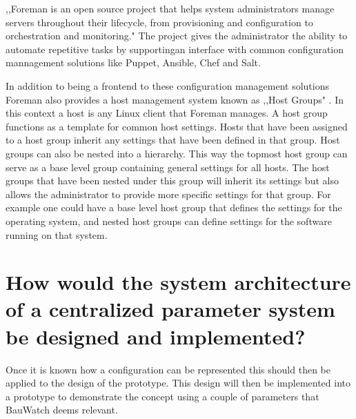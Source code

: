,,Foreman is an open source project that helps system administrators manage servers throughout their lifecycle, from provisioning and configuration to orchestration and monitoring." \cite{noauthor_foreman_nodate}
The project gives the administrator the ability to automate repetitive tasks by supportingan interface with common configuration mannagement solutions like Puppet, Ansible, Chef and Salt.

In addition to being a frontend to these configuration management solutions Foreman also provides a host management system known as ,,Host Groups" \cite{noauthor_foreman_nodate-1}. In this context a host is any Linux client that Foreman manages.
A host group functions as a template for common host settings.
Hosts that have been assigned to a host group inherit any settings that have been defined in that group.
Host groups can also be nested into a hierarchy.
This way the topmost host group can serve as a base level group containing general settings for all hosts.
The host groups that have been nested under this group will inherit its settings but also allows the administrator to provide more specific settings for that group.
For example one could have a base level host group that defines the settings for the operating system, and nested host groups can define settings for the software running on that system.

\section{How would the system architecture of a centralized parameter system be designed and implemented?}
Once it is known how a configuration can be represented this should then be applied to the design of the prototype. This design will then be implemented into a
prototype to demonstrate the concept using a couple of parameters that BauWatch deems relevant.

